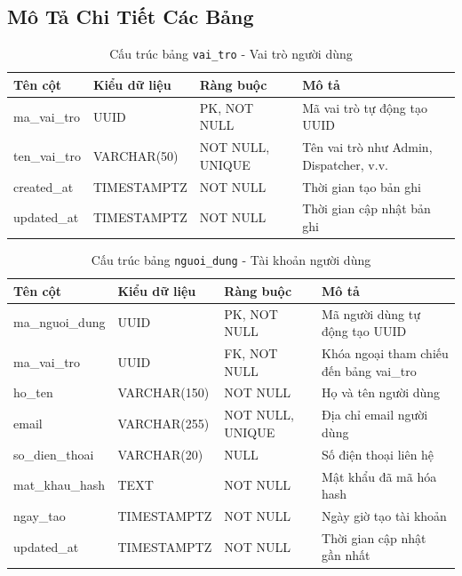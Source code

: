 \subsection{Mô Tả Chi Tiết Các Bảng}

\begin{table}[H]
  \centering
  \begin{tabularx}{\textwidth}{|l|l|l|>{\raggedright\arraybackslash}X|}
    \hline
    \textbf{Tên cột} & \textbf{Kiểu dữ liệu} & \textbf{Ràng buộc} & \textbf{Mô tả} \\
    \hline
    ma\_vai\_tro         & UUID            & PK, NOT NULL    & Mã vai trò tự động tạo UUID \\ \hline
    ten\_vai\_tro        & VARCHAR(50)     & NOT NULL, UNIQUE & Tên vai trò như Admin, Dispatcher, v.v. \\ \hline
    created\_at          & TIMESTAMPTZ     & NOT NULL        & Thời gian tạo bản ghi \\ \hline
    updated\_at          & TIMESTAMPTZ     & NOT NULL        & Thời gian cập nhật bản ghi \\
    \hline
  \end{tabularx}
  \caption{Cấu trúc bảng \texttt{vai\_tro} - Vai trò người dùng}
  \label{tab:db-vai-tro}
\end{table}

\begin{table}[H]
  \centering
  \begin{tabularx}{\textwidth}{|l|l|l|>{\raggedright\arraybackslash}X|}
    \hline
    \textbf{Tên cột} & \textbf{Kiểu dữ liệu} & \textbf{Ràng buộc} & \textbf{Mô tả} \\
    \hline
    ma\_nguoi\_dung      & UUID            & PK, NOT NULL    & Mã người dùng tự động tạo UUID \\ \hline
    ma\_vai\_tro         & UUID            & FK, NOT NULL    & Khóa ngoại tham chiếu đến bảng vai\_tro \\ \hline
    ho\_ten              & VARCHAR(150)    & NOT NULL        & Họ và tên người dùng \\ \hline
    email                & VARCHAR(255)    & NOT NULL, UNIQUE & Địa chỉ email người dùng \\ \hline
    so\_dien\_thoai      & VARCHAR(20)     & NULL            & Số điện thoại liên hệ \\ \hline
    mat\_khau\_hash      & TEXT            & NOT NULL        & Mật khẩu đã mã hóa hash \\ \hline
    ngay\_tao            & TIMESTAMPTZ     & NOT NULL        & Ngày giờ tạo tài khoản \\ \hline
    updated\_at          & TIMESTAMPTZ     & NOT NULL        & Thời gian cập nhật gần nhất \\
    \hline
  \end{tabularx}
  \caption{Cấu trúc bảng \texttt{nguoi\_dung} - Tài khoản người dùng}
  \label{tab:db-nguoi-dung}
\end{table}

